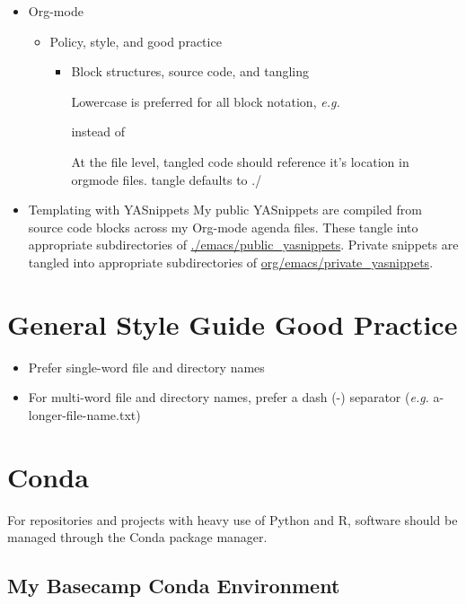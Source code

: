 \documentclass{article}
\begin{document}
\begin{itemize}
\begin{itemize}
\begin{itemize}
\item Org-mode
\label{sec:org87ea41d}
\begin{itemize}
\item Policy, style, and good practice
\label{sec:org6dbc9dc}
\begin{itemize}
\item Block structures, source code, and tangling
\label{sec:org150c08e}

Lowercase is preferred for all block notation, \emph{e.g.}

instead of

At the file level, tangled code should reference it's location in orgmode files.
tangle defaults to ./
\end{itemize}
\end{itemize}
\item Templating with YASnippets
\label{sec:org9052c43}
My public YASnippets are compiled from source code blocks across my Org-mode agenda files. These tangle into appropriate subdirectories of \href{emacs/public\_yasnippets/}{./emacs/public\_yasnippets}. Private snippets are tangled into appropriate subdirectories of \href{file:///home/jeszyman/repos/org/emacs/private\_yasnippets}{org/emacs/private\_yasnippets}.
\end{itemize}
\end{itemize}
\end{itemize}
\section*{General Style Guide Good Practice}
\label{sec:org62f1a54}
\begin{itemize}
\item Prefer single-word file and directory names
\item For multi-word file and directory names, prefer a dash (-) separator (\emph{e.g.} a-longer-file-name.txt)
\end{itemize}
\section*{Conda}
\label{sec:orgb2b0dcb}

For repositories and projects with heavy use of Python and R, software should be managed through the Conda package manager.
\subsection*{My Basecamp Conda Environment}
\label{sec:orgf1bf35f}
\end{document}

